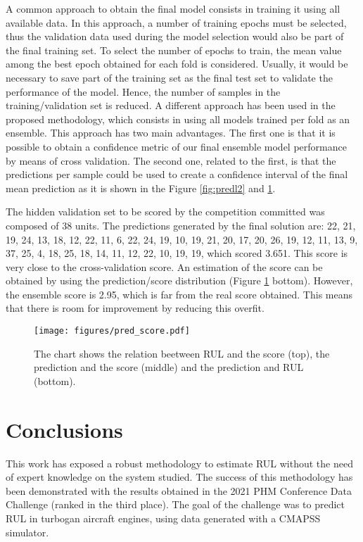 \documentclass[PHM, 2021]{PHMSociety}
\begin{document}
A common approach to obtain the final model consists in training it using all available data. In this approach, a number of training epochs must be selected, thus the validation data used during the model selection would also be part of the final training set. To select the number of epochs to train, the mean value among the best epoch obtained for each fold is considered. Usually, it would be necessary to save part of the training set as the final test set to validate the performance of the model. Hence, the number of samples in the training/validation set is reduced. 
A different approach has been used in the proposed methodology, which consists in using all models trained per fold as an ensemble. This approach has two main advantages. The first one is that it is possible to obtain a confidence metric of our final ensemble model performance by means of cross validation. The second one, related to the first, is that the predictions per sample could be used to create a confidence interval of the final mean prediction as it is shown in the Figure \ref{fig:predl2} and \ref{fig:pred_score}.

The hidden validation set to be scored by the competition committed was composed of 38 units. The predictions generated by the final solution are: 22, 21, 19, 24, 13, 18, 12, 22, 11, 6, 22, 24, 19, 10, 19, 21, 20, 17, 20, 26, 19, 12, 11, 13, 9, 37, 25, 4, 18, 25, 18, 14, 11, 12, 22, 10, 19, 19, which scored 3.651. This score is very close to the cross-validation score. An estimation of the score can be obtained by using the prediction/score distribution (Figure \ref{fig:pred_score} bottom). However, the ensemble score is 2.95, which is far from the real score obtained. This means that there is room for improvement by reducing this overfit.





\begin{figure}[t]
\centering
\texttt{[image: figures/pred\_score.pdf]}
\caption{The chart shows the relation beetween  RUL and the score (top), the prediction and the score (middle) and the prediction and RUL (bottom).}
\label{fig:pred_score}
\end{figure}


\section{Conclusions}

This work has exposed a robust methodology to estimate RUL without the need of expert knowledge on the system studied. The success of this methodology has been demonstrated with the results obtained in the 2021 PHM Conference Data Challenge (ranked in the third place). The goal of the challenge was to predict RUL in turbogan aircraft engines, using data generated with a CMAPSS simulator.
\end{document}
